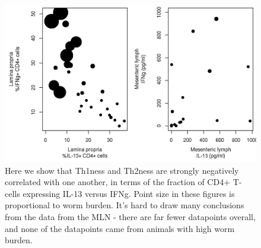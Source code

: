 \documentclass[12pt,reqno,final,pdftex]{amsart}\usepackage[]{graphicx}\usepackage[]{color}
\newenvironment{knitrout}{}{} %
\theoremstyle{plain}
\numberwithin{equation}{part}
\begin{document}
\begin{knitrout}\scriptsize
{}\color{fgcolor}\begin{figure}

\includegraphics[width=\linewidth]{figure/unnamed-chunk-7-1} \hfill{}

\caption[Here we show that Th1ness and Th2ness are strongly negatively correlated with one another, in terms of the fraction of CD4+ T-cells expressing IL-13 versus IFNg]{Here we show that Th1ness and Th2ness are strongly negatively correlated with one another, in terms of the fraction of CD4+ T-cells expressing IL-13 versus IFNg. Point size in these figures is proportional to worm burden. It's hard to draw many conclusions from the data from the MLN - there are far fewer datapoints overall, and none of the datapoints came from animals with high worm burden.}\label{fig:unnamed-chunk-7}
\end{figure}


\end{knitrout}
\end{document}
